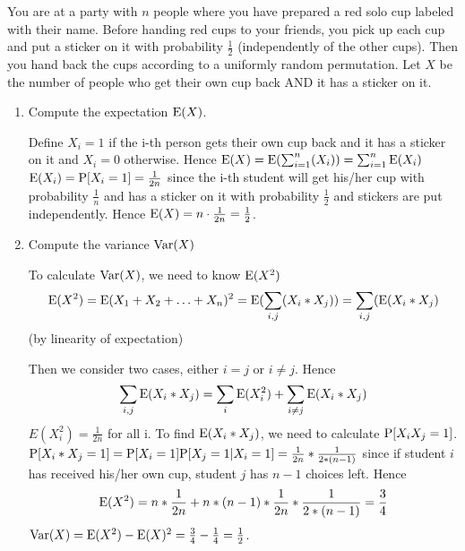 \question You are at a party with $n$ people where you have prepared a 
red solo cup labeled with their name. Before handing red cups to your 
friends, you pick up each cup and put a sticker on it with probability 
$\frac{1}{2}$ (independently of the other cups). Then you hand back the 
cups according to a uniformly random permutation. Let $X$ be the number 
of people who get their own cup back AND it has a sticker on it.
\begin{enumerate}[label=(\alph*)]
\item Compute the expectation $\E(X)$.
        \begin{solution}[3cm]
Define $X_i = 1$ if the i-th person gets their own cup back and it 
has a sticker on it and $X_i = 0$ otherwise. Hence $\E(X) = \E(\sum_{i=1}^{n}(X_i)) = \sum_{i=1}^{n} \E(X_i) $
$\E(X_i) = \P[X_i = 1] = \frac{1}{2n}$ since the i-th student will get 
his/her cup with probability $\frac{1}{n}$ and has a sticker on it with 
probability $\frac{1}{2}$ and stickers are put independently. 
Hence $\E(X) = n \cdot \frac{1}{2n} = \frac{1}{2}$.
\end{solution}

\item Compute the variance $\var(X)$
    \begin{solution}[6cm]
To calculate $\var(X)$, we need to know $\E(X^2)$
\begin{equation*}
\E(X^2) = \E (X_1 + X_2 + \dotsc + X_n)^2  = \E(\sum_{i, j}(X_i * X_j) ) = 
\sum_{i,j} (\E(X_i * X_j )
\end{equation*} (by linearity of expectation) 

Then we consider two cases, either $i = j$ or $i \neq j.$ 
Hence 
\begin{equation*}
\sum_{i,j} \E(X_i * X_j) = \sum_{i} \E(X_i^2) + \sum_ {i \neq j} \E(X_i * X_j ) 
\end{equation*}
$E(X_i^2) = \frac{1}{2n}$ for all i. 
To find $\E(X_i * X_j  )$, we need to calculate $\P[X_iX_j = 1]$. 
$\P[X_i * X_j  = 1] = \P[X_i = 1] \P[X_j = 1 | X_i = 1] = \frac{1}{2n} * \frac{1}{2 * (n-1)}$ since if student $i$ has received his/her own cup, student $j$ has $n - 1$ choices left. 
Hence 
\begin{equation*}
\E(X^2 ) = n * \frac{1}{2n} + n * (n - 1) * \frac{1}{2n} * \frac{1}{2 * (n-1)}= 
\frac{3}{4}
\end{equation*}
$\var(X) = \E(X^2 ) - \E(X)^2 = \frac{3}{4} - \frac{1}{4} = \frac{1}{2} $.
\end{solution}
\end{enumerate}